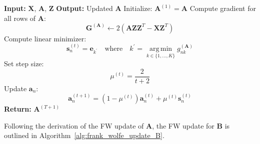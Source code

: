 \documentclass{article}
\begin{document}
\begin{algorithm}[H]
    \caption{Update A via Frank-Wolfe}
    \label{alg:frank_wolfe_update_A}
    \begin{algorithmic}[1]
    \State \textbf{Input:} $\mathbf{X}$, $\mathbf{A}$, $\mathbf{Z}$
    \State \textbf{Output:} Updated $\mathbf{A}$
    \State Initialize: $\mathbf{A}^{(1)} = \mathbf{A}$
        \State Compute gradient for all rows of $\mathbf{A}$:
        \begin{equation}
        \mathbf{G}^{(\mathbf{A})} \gets 2 \left( \mathbf{A} \mathbf{Z} \mathbf{Z}^T - \mathbf{X} \mathbf{Z}^T \right)
        \end{equation}
            \State Compute linear minimizer:
            \begin{equation}
            \mathbf{s}_n^{(t)} = \mathbf{e}_{k^\prime} \quad \text{where} \quad k^\prime = \operatorname*{arg\,min}_{ k \in \{1, ..., K\} } g_{nk}^{(\mathbf{A})}
            \end{equation}
            \State Set step size:
            \begin{equation}
            \mu^{(t)} = \frac{2}{t+2}
            \end{equation}
            \State Update $\mathbf{a}_n$:
            \begin{equation}
            \mathbf{a}_n^{(t+1)} = (1-\mu^{(t)}) \mathbf{a}_n^{(t)} + \mu^{(t)} \mathbf{s}_n^{(t)}
            \end{equation}
        \EndFor
    \EndFor
    \State \textbf{Return:} $\mathbf{A}^{(T+1)}$
    \end{algorithmic}
\end{algorithm}

Following the derivation of the FW update of $\mathbf{A}$, the FW update for $\mathbf{B}$ is outlined in Algorithm~\ref{alg:frank_wolfe_update_B}.
\end{document}
